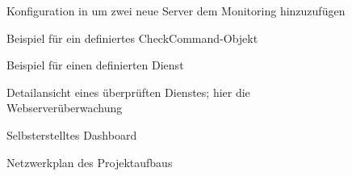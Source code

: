 \begin{figure}[!htb]
\centering
{}
\caption{Konfiguration in  um zwei neue Server dem Monitoring hinzuzufügen}
\label{screen:newservers}
\end{figure}

\begin{figure}[!htb]
\centering
{}
\caption{Beispiel für ein definiertes \glqq{}CheckCommand\grqq{}-Objekt}
\label{screen:loaddefinition}
\end{figure}

\begin{figure}[!htb]
\centering
{}
\caption{Beispiel für einen definierten Dienst}
\label{screen:service}
\end{figure}

\begin{figure}[!htb]
\centering
{}
\caption{Detailansicht eines überprüften Dienstes; hier die Webserverüberwachung}
\label{screen:webserver}
\end{figure}

\begin{figure}[!htb]
\centering
{}
\caption{Selbsterstelltes Dashboard}
\label{screen:dashboard}
\end{figure}

\begin{figure}[!htb]
\centering
{}
\caption{Netzwerkplan des Projektaufbaus}
\label{screen:network}
\end{figure}